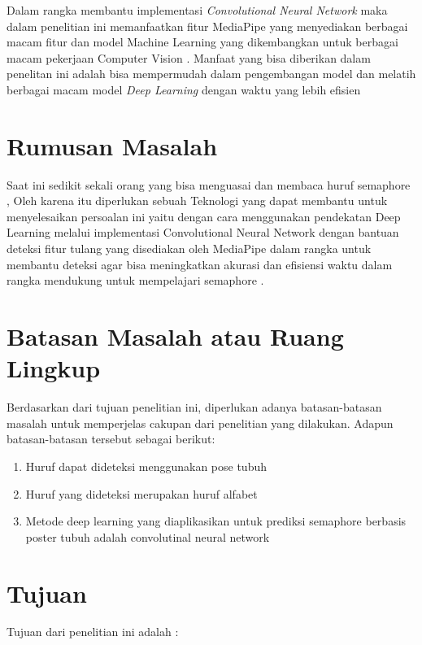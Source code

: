 Dalam rangka membantu implementasi \textit{Convolutional Neural Network} maka dalam penelitian ini memanfaatkan fitur MediaPipe yang menyediakan berbagai macam fitur dan model Machine Learning yang dikembangkan untuk berbagai macam pekerjaan Computer Vision . Manfaat yang bisa diberikan dalam penelitan ini adalah bisa mempermudah dalam pengembangan model dan melatih berbagai macam model \textit{Deep Learning} dengan waktu yang lebih efisien   

\section{Rumusan Masalah}

Saat ini sedikit sekali orang yang bisa menguasai dan membaca huruf semaphore , Oleh karena itu diperlukan sebuah Teknologi yang dapat membantu untuk menyelesaikan persoalan ini yaitu dengan cara menggunakan pendekatan Deep Learning melalui implementasi Convolutional Neural Network dengan bantuan deteksi fitur tulang yang disediakan oleh MediaPipe dalam rangka untuk membantu deteksi agar bisa meningkatkan akurasi dan efisiensi waktu dalam rangka mendukung untuk mempelajari semaphore .

\section{Batasan Masalah atau Ruang Lingkup}

Berdasarkan dari tujuan penelitian ini, diperlukan adanya batasan-batasan masalah untuk memperjelas cakupan dari penelitian yang dilakukan. Adapun batasan-batasan tersebut sebagai berikut:

\begin{enumerate}
\item Huruf dapat dideteksi menggunakan pose tubuh
\item Huruf yang dideteksi merupakan huruf alfabet 
\item Metode deep learning yang diaplikasikan untuk prediksi semaphore berbasis poster tubuh adalah convolutinal neural network
\end{enumerate}

\section{Tujuan}

Tujuan dari penelitian ini adalah :

